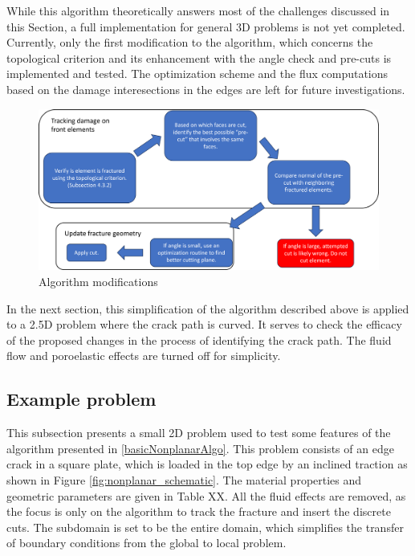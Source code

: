 While this algorithm theoretically answers most of the challenges discussed in this Section, a full implementation for general 3D problems is not yet completed. Currently, only the first modification to the algorithm, which concerns the topological criterion and its enhancement with the angle check and pre-cuts is implemented and tested. The optimization scheme and the flux computations based on the damage interesections in the edges are left for future investigations. 

\begin{figure}[h]
    \centering
    \includegraphics[width=0.95\linewidth]{Chapter4/figures/nonplanar/nonplanar_algo.png}
    \caption{Algorithm modifications}
    \label{fig:nonplanar_algo}
\end{figure}


In the next section, this simplification of the algorithm described above is applied to a 2.5D problem where the crack path is curved. It serves to check the efficacy of the proposed changes in the process of identifying the crack path. The fluid flow and poroelastic effects are turned off for simplicity.

\subsection{Example problem}

This subsection presents a small 2D problem used to test some features of the algorithm presented in \ref{basicNonplanarAlgo}. This problem consists of an edge crack in a square plate, which is loaded in the top edge by an inclined traction as shown in Figure \ref{fig:nonplanar_schematic}. The material properties and geometric parameters are given in Table XX. All the fluid effects are removed, as the focus is only on the algorithm to track the fracture and insert the discrete cuts. The subdomain is set to be the entire domain, which simplifies the transfer of boundary conditions from the global to local problem. 

